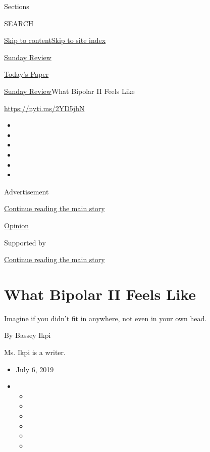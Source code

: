 Sections

SEARCH

\protect\hyperlink{site-content}{Skip to
content}\protect\hyperlink{site-index}{Skip to site index}

\href{https://www.nytimes.com/section/opinion/sunday}{Sunday Review}

\href{https://myaccount.nytimes.com/auth/login?response_type=cookie\&client_id=vi}{}

\href{https://www.nytimes.com/section/todayspaper}{Today's Paper}

\href{/section/opinion/sunday}{Sunday Review}\textbar{}What Bipolar II
Feels Like

\href{https://nyti.ms/2YD5jbN}{https://nyti.ms/2YD5jbN}

\begin{itemize}
\item
\item
\item
\item
\item
\item
\end{itemize}

Advertisement

\protect\hyperlink{after-top}{Continue reading the main story}

\href{/section/opinion}{Opinion}

Supported by

\protect\hyperlink{after-sponsor}{Continue reading the main story}

\hypertarget{what-bipolar-ii-feels-like}{%
\section{What Bipolar II Feels Like}\label{what-bipolar-ii-feels-like}}

Imagine if you didn't fit in anywhere, not even in your own head.

By Bassey Ikpi

Ms. Ikpi is a writer.

\begin{itemize}
\item
  July 6, 2019
\item
  \begin{itemize}
  \item
  \item
  \item
  \item
  \item
  \item
  \end{itemize}
\end{itemize}


